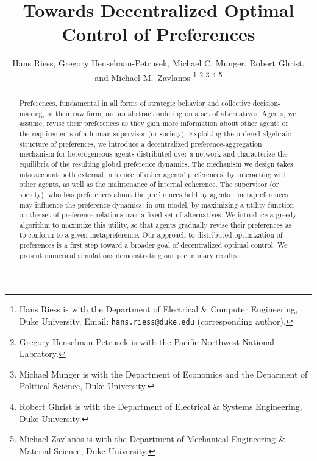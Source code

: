 \documentclass[conference]{ieeeconf}
\begin{document}
\title{\bf Towards Decentralized Optimal Control of Preferences}

\author{Hans Riess, Gregory Henselman-Petrusek, Michael C. Munger, Robert Ghrist, and Michael M.~Zavlanos%
\thanks{Hans Riess is with the Department of Electrical \& Computer Engineering, Duke University. Email: {\tt hans.riess@duke.edu} (corresponding author).}%
\thanks{Gregory Henselman-Petrusek is with the Pacific Northwest National Labratory.}%
\thanks{Michael Munger is with the Department of Economics and the Deparment of Political Science, Duke University.}%
\thanks{Robert Ghrist is with the Department of Electrical \& Systems Engineering, Duke University.}%
\thanks{Michael Zavlanos is with the Department of Mechanical Engineering \& Material Science, Duke University.}%
}
\maketitle

\begin{abstract}
Preferences, fundamental in all forms of strategic behavior and collective decision-making, in their raw form, are an abstract ordering on a set of alternatives. Agents, we assume, revise their preferences as they gain more information about other agents or the requirements of a human supervisor (or society). Exploiting the ordered algebraic structure of preferences,  we introduce a decentralized preference-aggregation mechanism for heterogeneous agents distributed over a network and characterize the equilibria of the resulting global preference dynamics. The mechanism we design takes into account both external influence of other agents' preferences, by interacting with other agents, as well as the maintenance of internal coherence. The supervisor (or society), who has preferences about the preferences held by agents---metapreferences---may influence the preference dynamics, in our model, by maximizing a utility function on the set of preference relations over a fixed set of alternatives. We introduce a greedy algorithm to maximize this utility, so that agents gradually revise their preferences as to conform to a given metapreference. Our approach to distributed optimization of preferences is a first step toward a broader goal of decentralized optimal control. We present numerical simulations demonstrating our preliminary results.
\end{abstract}

\end{document}
